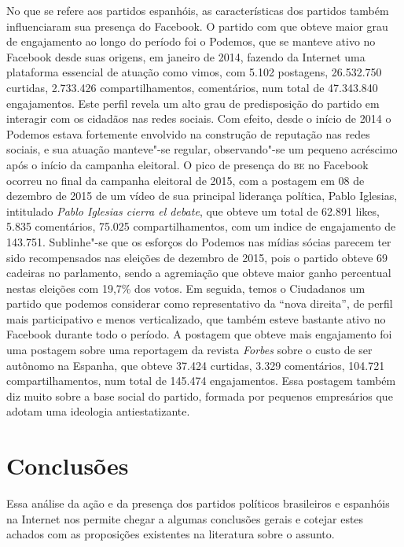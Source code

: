 No que se refere aos partidos espanhóis, as características dos partidos
também influenciaram sua presença do Facebook. O partido com que obteve
maior grau de engajamento ao longo do período foi o Podemos, que se
manteve ativo no Facebook desde suas origens, em janeiro de 2014,
fazendo da Internet uma plataforma essencial de atuação como vimos, com
5.102 postagens, 26.532.750 curtidas, 2.733.426 compartilhamentos,
comentários, num total de 47.343.840 engajamentos. Este perfil revela um
alto grau de predisposição do partido em interagir com os cidadãos nas
redes sociais. Com efeito, desde o início de 2014 o Podemos estava
fortemente envolvido na construção de reputação nas redes sociais, e sua
atuação manteve"-se regular, observando"-se um pequeno acréscimo após o
início da campanha eleitoral. O pico de presença do \textsc{be} no Facebook
ocorreu no final da campanha eleitoral de 2015, com a postagem em
08 de dezembro de 2015 de um vídeo de sua principal liderança política, Pablo
Iglesias, intitulado \emph{Pablo Iglesias cierra el debate}, que obteve
um total de 62.891 likes, 5.835 comentários, 75.025 compartilhamentos,
com um indice de engajamento de 143.751. Sublinhe"-se que os esforços do
Podemos nas mídias sócias parecem ter sido recompensados nas eleições de
dezembro de 2015, pois o partido obteve 69 cadeiras no parlamento, sendo
a agremiação que obteve maior ganho percentual nestas eleições com
19,7\% dos votos. Em seguida, temos o Ciudadanos um partido que podemos
considerar como representativo da ``nova direita'', de perfil mais
participativo e menos verticalizado, que também esteve bastante ativo no
Facebook durante todo o período. A postagem que obteve mais engajamento
foi uma postagem sobre uma reportagem da revista \emph{Forbes} sobre o
custo de ser autônomo na Espanha, que obteve 37.424 curtidas, 3.329
comentários, 104.721 compartilhamentos, num total de 145.474
engajamentos. Essa postagem também diz muito sobre a base social do
partido, formada por pequenos empresários que adotam uma ideologia
antiestatizante.


\section{Conclusões}

Essa análise da ação e da presença dos partidos políticos brasileiros e
espanhóis na Internet nos permite chegar a algumas conclusões gerais e
cotejar estes achados com as proposições existentes na literatura sobre
o assunto.

